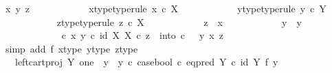 \begin{isabellebody}
\ x\ y\ z\isanewline
\ \ \ \ \ \ \ \ \ \ \isamarkupfalse%
\ x{\isacharunderscore}{\kern0pt}type{\isacharbrackleft}{\kern0pt}type{\isacharunderscore}{\kern0pt}rule{\isacharbrackright}{\kern0pt}{\isacharcolon}{\kern0pt}\ {\isachardoublequoteopen}x\ {\isasymin}\isactrlsub c\ X{\isachardoublequoteclose}\isanewline
\ \ \ \ \ \ \ \ \ \ \isamarkupfalse%
\ y{\isacharunderscore}{\kern0pt}type{\isacharbrackleft}{\kern0pt}type{\isacharunderscore}{\kern0pt}rule{\isacharbrackright}{\kern0pt}{\isacharcolon}{\kern0pt}\ {\isachardoublequoteopen}y\ {\isasymin}\isactrlsub c\ Y{\isachardoublequoteclose}\isanewline
\ \ \ \ \ \ \ \ \ \ \isamarkupfalse%
\ z{\isacharunderscore}{\kern0pt}type{\isacharbrackleft}{\kern0pt}type{\isacharunderscore}{\kern0pt}rule{\isacharbrackright}{\kern0pt}{\isacharcolon}{\kern0pt}\ {\isachardoublequoteopen}z\ {\isasymin}\isactrlsub c\ X{\isachardoublequoteclose}\isanewline
\ \ \ \ \ \ \ \ \ \ \isamarkupfalse%
\ {\isachardoublequoteopen}z\ {\isasymnoteq}\ x{\isachardoublequoteclose}\isanewline
\ \ \ \ \ \ \ \ \ \ \isamarkupfalse%
\ {\isachardoublequoteopen}y\ {\isasymnoteq}\ y{}{\isachardoublequoteclose}\isanewline
\ \ \ \ \ \ \ \ \ \ \isamarkupfalse%
\ {\isachardoublequoteopen}{\isacharparenleft}{\kern0pt}{\isasymTheta}\ {\isasymcirc}\isactrlsub c\ {\isasymlangle}x{\isacharcomma}{\kern0pt}\ y{\isasymrangle}{\isacharparenright}{\kern0pt}\isactrlsup {\isasymflat}\ {\isasymcirc}\isactrlsub c\ {\isasymlangle}id\ X{\isacharcomma}{\kern0pt}\ {\isasymbeta}\isactrlbsub X\isactrlesub {\isasymrangle}\ {\isasymcirc}\isactrlsub c\ z\ {\isacharequal}{\kern0pt}\ into\ {\isasymcirc}\isactrlsub c\ \ \ {\isasymlangle}y{\isacharcomma}{\kern0pt}\ {\isasymlangle}x{\isacharcomma}{\kern0pt}\ z{\isasymrangle}{\isasymrangle}{\isachardoublequoteclose}\isanewline
\ \ \ \ \ \ \ \ \ \ \ \ \isamarkupfalse%
\ {\isacharparenleft}{\kern0pt}simp\ add{\isacharcolon}{\kern0pt}\ f{}\ x{\isacharunderscore}{\kern0pt}type\ y{\isacharunderscore}{\kern0pt}type\ z{\isacharunderscore}{\kern0pt}type{\isacharparenright}{\kern0pt}\isanewline
\ \ \ \ \ \ \ \ \ \ \isamarkupfalse%
\ \isamarkupfalse%
\ {\isachardoublequoteopen}{\isachardot}{\kern0pt}{\isachardot}{\kern0pt}{\isachardot}{\kern0pt}\ {\isacharequal}{\kern0pt}\ {\isacharparenleft}{\kern0pt}left{\isacharunderscore}{\kern0pt}cart{\isacharunderscore}{\kern0pt}proj\ Y\ one\ {\isasymamalg}\ {\isacharparenleft}{\kern0pt}{\isacharparenleft}{\kern0pt}y{}\ {\isasymamalg}\ y{}{\isacharparenright}{\kern0pt}\ {\isasymcirc}\isactrlsub c\ case{\isacharunderscore}{\kern0pt}bool\ {\isasymcirc}\isactrlsub c\ eq{\isacharunderscore}{\kern0pt}pred\ Y\ {\isasymcirc}\isactrlsub c\ {\isacharparenleft}{\kern0pt}id\ Y\ {\isasymtimes}\isactrlsub f\ y{}{\isacharparenright}{\kern0pt}{\isacharparenright}{\kern0pt}{\isacharparenright}{\kern0pt}\isanewline

\end{isabellebody}
